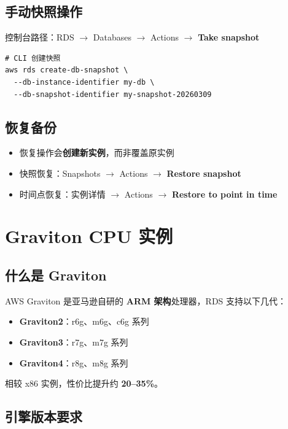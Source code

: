 \documentclass[12pt, a4paper]{article}
\begin{document}
\subsection{手动快照操作}

控制台路径：RDS $\to$ Databases $\to$ Actions $\to$ \textbf{Take snapshot}

\begin{lstlisting}
# CLI 创建快照
aws rds create-db-snapshot \
  --db-instance-identifier my-db \
  --db-snapshot-identifier my-snapshot-20260309
\end{lstlisting}

\subsection{恢复备份}

\begin{itemize}[leftmargin=2em]
  \item 恢复操作会\textbf{创建新实例}，而非覆盖原实例
  \item 快照恢复：Snapshots $\to$ Actions $\to$ \textbf{Restore snapshot}
  \item 时间点恢复：实例详情 $\to$ Actions $\to$ \textbf{Restore to point in time}
\end{itemize}

\section{Graviton CPU 实例}

\subsection{什么是 Graviton}

AWS Graviton 是亚马逊自研的 \textbf{ARM 架构}处理器，RDS 支持以下几代：

\begin{itemize}[leftmargin=2em]
  \item \textbf{Graviton2}：r6g、m6g、c6g 系列
  \item \textbf{Graviton3}：r7g、m7g 系列
  \item \textbf{Graviton4}：r8g、m8g 系列
\end{itemize}

相较 x86 实例，性价比提升约 \textbf{20--35\%}。

\subsection{引擎版本要求}
\end{document}

